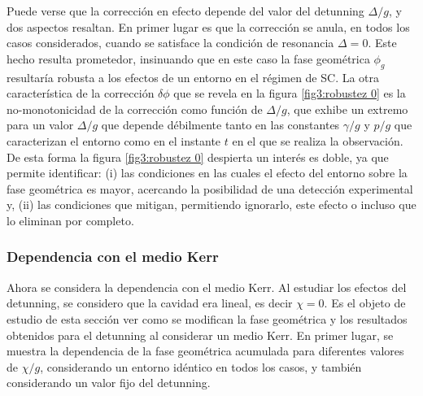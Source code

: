 Puede verse que la corrección en efecto depende del valor del detunning $\Delta/g$, y dos aspectos resaltan. En primer lugar es que la corrección se anula, en todos los casos considerados, cuando se satisface la condición de resonancia $\Delta=0$. Este hecho resulta prometedor,  insinuando que en este caso la fase geométrica $\phi_g$ resultaría robusta a los efectos de un entorno en el régimen de SC. La otra característica de la corrección $\delta\phi$ que se revela en la figura \ref{fig3:robustez 0} es la no-monotonicidad de la corrección como función de $\Delta/g$, que exhibe un extremo para un valor $\Delta/g$ que depende débilmente tanto en las constantes $\gamma/g$ y $p/g$ que caracterizan el entorno como en el instante $t$ en el que se realiza la observación. De esta forma la figura \ref{fig3:robustez 0} despierta un interés es doble, ya que permite identificar: (i) las condiciones en las cuales el efecto del entorno sobre la fase geométrica es mayor, acercando la posibilidad de una detección experimental y, (ii) las condiciones que mitigan, permitiendo ignorarlo, este efecto o incluso que lo eliminan por completo.

\subsubsection{Dependencia con el medio Kerr}

Ahora se considera la dependencia con el medio Kerr. Al estudiar los efectos del detunning, se considero que la cavidad era lineal, es decir $\chi=0$. Es el objeto de estudio de esta sección ver como se modifican la fase geométrica y los resultados obtenidos para el detunning al considerar un medio Kerr. En primer lugar, se muestra la dependencia de la fase geométrica acumulada para diferentes valores de $\chi/g$, considerando un entorno idéntico en todos los casos, y también considerando un valor fijo del detunning.

